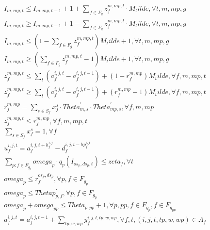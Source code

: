 \begin{align}
  & I_{m , mp , t} \leq I_{m , mp , t - 1} + 1 + \sum_{f \in F_{g}} z_{f}^{m , mp , t} \cdot M_tilde , \forall t , m , mp , g \tag{eq\_0001} \\
  &  I_{m , mp , t} \geq I_{m , mp , t - 1} + 1 - \sum_{f \in F_{g}} z_{f}^{m , mp , t} \cdot M_tilde , \forall t , m , mp , g  \tag{eq\_0002} \\
  &  I_{m , mp , t} \leq \left(1 - \sum_{f \in F_{g}} z_{f}^{m , mp , t}\right) M_tilde + 1 , \forall t , m , mp , g  \tag{eq\_0003} \\
  & I_{m , mp , t} \geq \left(\sum_{f \in F_{g}} z_{f}^{m , mp , t} - 1\right) M_tilde + 1 , \forall t , m , mp , g \tag{eq\_0004} \\
  & z_{f}^{m , mp , t} \leq \sum_{t} \left(a_{f}^{i , j , t} - a_{f}^{i , j , t - 1}\right) + \left(1 - r_{f}^{m , mp}\right) M_tilde , \forall f , m , mp , t \tag{eq\_0005} \\
  & z_{f}^{m , mp , t} \geq \sum_{t} \left(a_{f}^{i , j , t} - a_{f}^{i , j , t - 1}\right) + \left(r_{f}^{m , mp} - 1\right) M_tilde , \forall f , m , mp , t \tag{eq\_0006} \\
  & r_{f}^{m , mp} = \sum_{s \in S_{f}} x_{f}^{s} \cdot \mathit{Theta} _{m , s}^{'} \cdot \mathit{Theta} _{mp , s}^{'} , \forall f , m , mp \tag{eq\_0007} \\
  & z_{f}^{m , mp , t} \leq r_{f}^{m , mp} , \forall f , m , mp , t \tag{eq\_0008} \\
  & \sum_{s \in S_{f}} x_{f}^{s} = 1 , \forall f \tag{eq\_0009} \\
  & u_{f}^{i , j , t} = a_{f}^{i , j , t + h_{f}^{i , j}} - d_{f}^{i , j , t - hp _{f}^{i , j}} \tag{eq\_0010} \\
  & \underset{p : f \in F_{g_{p}}}{\sum} \mathit{omega}_{p} \cdot q_{p} \left(I_{o s_{p} , d s_{p} , t}\right) \leq \mathit{zeta}_{f} , \forall t \tag{eq\_0011} \\
  & \mathit{omega}_{p} \leq r_{f}^{o s_{p} , d s_{p}} , \forall p , f \in F_{g_{p}} \tag{eq\_0012} \\
  & \mathit{omega}_{p} \leq Thetap _{p , f}^{'} , \forall p , f \in F_{g_{p}} \tag{eq\_0013} \\
  & \mathit{omega}_{p} + \mathit{omega}_{pp} \leq \mathit{Theta}_{p , pp} + 1 , \forall p , pp , f \in F_{g_{p}} , f \in F_{g_{pp}} \tag{eq\_0014} \\
  & a_{f}^{i , j , t} = a_{f}^{i , j , t - 1} + \sum_{tp , w , wp} y_{f}^{i , j , t , tp , w , wp} , \forall f , t , \left(i , j , t , tp , w , wp\right) \in A_{f} \tag{eq\_0015} \\

\end{align}
